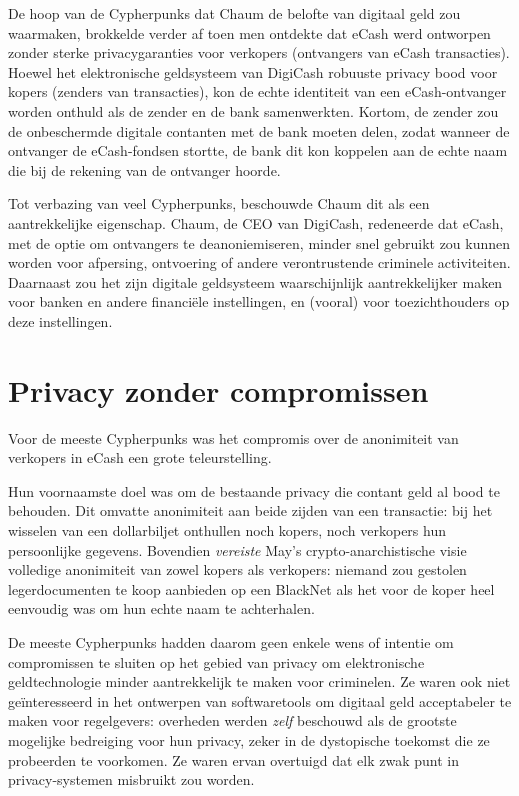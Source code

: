 \documentclass[
  a5paper,
  smalldemyvopaper,11pt,twoside,onecolumn,openright,extrafontsizes]{memoir}
\begin{document}
De hoop van de Cypherpunks dat Chaum de belofte van digitaal geld zou
waarmaken, brokkelde verder af toen men ontdekte dat eCash werd
ontworpen zonder sterke privacygaranties voor verkopers (ontvangers van
eCash transacties). Hoewel het elektronische geldsysteem van DigiCash
robuuste privacy bood voor kopers (zenders van transacties), kon de
echte identiteit van een eCash-ontvanger worden onthuld als de zender en
de bank samenwerkten. Kortom, de zender zou de onbeschermde digitale
contanten met de bank moeten delen, zodat wanneer de ontvanger de
eCash-fondsen stortte, de bank dit kon koppelen aan de echte naam die
bij de rekening van de ontvanger hoorde.

Tot verbazing van veel Cypherpunks, beschouwde Chaum dit als een
aantrekkelijke eigenschap. Chaum, de CEO van DigiCash, redeneerde dat
eCash, met de optie om ontvangers te deanoniemiseren, minder snel
gebruikt zou kunnen worden voor afpersing, ontvoering of andere
verontrustende criminele activiteiten. Daarnaast zou het zijn digitale
geldsysteem waarschijnlijk aantrekkelijker maken voor banken en andere
financiële instellingen, en (vooral) voor toezichthouders op deze
instellingen.

\section{Privacy zonder compromissen}\label{privacy-zonder-compromissen}

Voor de meeste Cypherpunks was het compromis over de anonimiteit van
verkopers in eCash een grote teleurstelling.

Hun voornaamste doel was om de bestaande privacy die contant geld al
bood te behouden. Dit omvatte anonimiteit aan beide zijden van een
transactie: bij het wisselen van een dollarbiljet onthullen noch kopers,
noch verkopers hun persoonlijke gegevens. Bovendien \emph{vereiste}
May's crypto-anarchistische visie volledige anonimiteit van zowel kopers
als verkopers: niemand zou gestolen legerdocumenten te koop aanbieden op
een BlackNet als het voor de koper heel eenvoudig was om hun echte naam
te achterhalen.

De meeste Cypherpunks hadden daarom geen enkele wens of intentie om
compromissen te sluiten op het gebied van privacy om elektronische
geldtechnologie minder aantrekkelijk te maken voor criminelen. Ze waren
ook niet geïnteresseerd in het ontwerpen van softwaretools om digitaal
geld acceptabeler te maken voor regelgevers: overheden werden
\emph{zelf} beschouwd als de grootste mogelijke bedreiging voor hun
privacy, zeker in de dystopische toekomst die ze probeerden te
voorkomen. Ze waren ervan overtuigd dat elk zwak punt in
privacy-systemen misbruikt zou worden.
\end{document}
